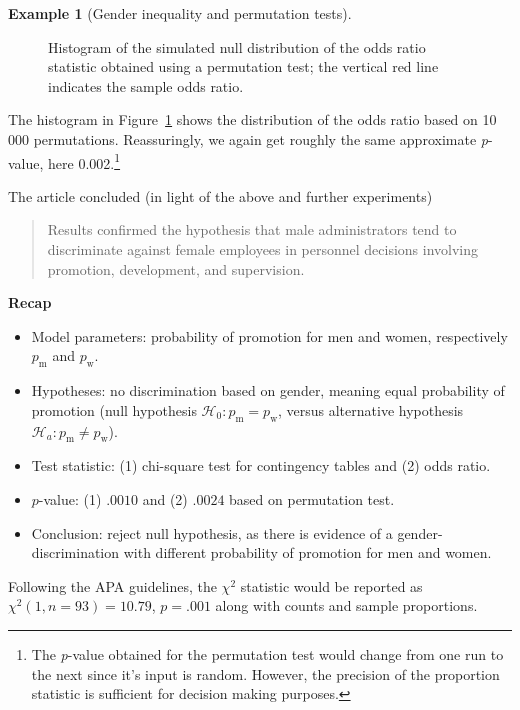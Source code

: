 \documentclass[
  11pt,
  letterpaper,
]{scrbook}
\providecommand{\tightlist}{%
  \setlength{\itemsep}{0pt}\setlength{\parskip}{0pt}}\usepackage{longtable,booktabs,array}
\theoremstyle{definition}
\theoremstyle{definition}
\newtheorem{example}{Example}[chapter]
\theoremstyle{remark}
\begin{document}
\begin{example}[Gender inequality and permutation
tests]
\begin{figure}[ht!]
{}

\caption{\label{fig-infer-odds-ratio-permutation}Histogram of the
simulated null distribution of the odds ratio statistic obtained using a
permutation test; the vertical red line indicates the sample odds
ratio.}

\end{figure}%

The histogram in Figure~\ref{fig-infer-odds-ratio-permutation} shows the
distribution of the odds ratio based on 10 000 permutations.
Reassuringly, we again get roughly the same approximate \emph{p}-value,
here 0.002.\footnote{The \emph{p}-value obtained for the permutation
  test would change from one run to the next since it's input is random.
  However, the precision of the proportion statistic is sufficient for
  decision making purposes.}

The article concluded (in light of the above and further experiments)

\begin{quote}
Results confirmed the hypothesis that male administrators tend to
discriminate against female employees in personnel decisions involving
promotion, development, and supervision.
\end{quote}

\textbf{Recap}

\begin{itemize}
\tightlist
\item
  Model parameters: probability of promotion for men and women,
  respectively \(p_{\text{m}}\) and \(p_{\text{w}}\).
\item
  Hypotheses: no discrimination based on gender, meaning equal
  probability of promotion (null hypothesis
  \(\mathscr{H}_0: p_{\text{m}}=p_{\text{w}}\), versus alternative
  hypothesis \(\mathscr{H}_a: p_{\text{m}}\neq p_{\text{w}}\)).
\item
  Test statistic: (1) chi-square test for contingency tables and (2)
  odds ratio.
\item
  \(p\)-value: (1) \(.0010\) and (2) \(.0024\) based on permutation
  test.
\item
  Conclusion: reject null hypothesis, as there is evidence of a
  gender-discrimination with different probability of promotion for men
  and women.
\end{itemize}

Following the APA guidelines, the \(\chi^2\) statistic would be reported
as \(\chi^2(1, n = 93) = 10.79\), \(p = .001\) along with counts and
sample proportions.

\end{example}
\end{document}
